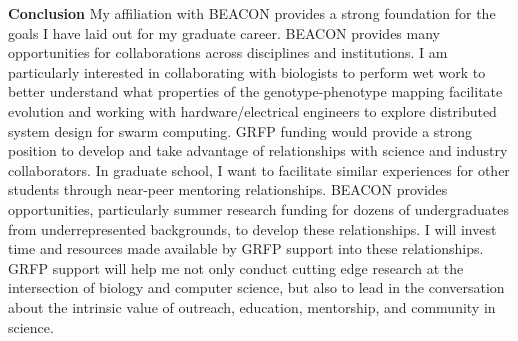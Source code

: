 \textbf{Conclusion}
My affiliation with BEACON provides a strong foundation for the goals I have laid out for my graduate career.
BEACON provides many opportunities for collaborations across disciplines and institutions.
I am particularly interested in collaborating with biologists to perform wet work to better understand what properties of the genotype-phenotype mapping facilitate evolution and working with hardware/electrical engineers to explore distributed system design for swarm computing.
GRFP funding would provide a strong position to develop and take advantage of relationships with science and industry collaborators.
In graduate school, I want to facilitate similar experiences for other students through near-peer mentoring relationships.
BEACON provides opportunities, particularly summer research funding for dozens of undergraduates from underrepresented backgrounds, to develop these relationships.
I will invest time and resources made available by GRFP support into these relationships.
GRFP support will help me not only conduct cutting edge research at the intersection of biology and computer science, but also to lead in the conversation about the intrinsic value of outreach, education, mentorship, and community in science.
